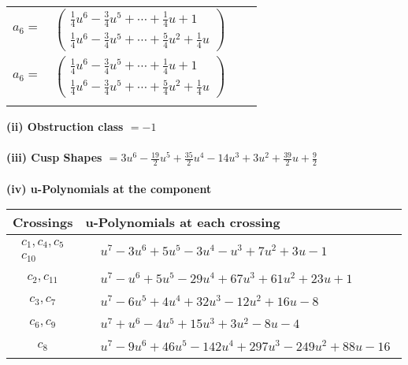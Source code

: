 \documentclass[1p]{elsarticle_modified}
\theoremstyle{definition}
\begin{document}
\begin{tabular}{m{7pt} m{180pt} m{7pt} m{180pt} }
\flushright $a_{6}=$&$\begin{pmatrix}\frac{1}{4} u^6-\frac{3}{4} u^5+\cdots+\frac{1}{4} u+1\\\frac{1}{4} u^6-\frac{3}{4} u^5+\cdots+\frac{5}{4} u^2+\frac{1}{4} u\end{pmatrix}$\\ \flushright $a_{6}=$&$\begin{pmatrix}\frac{1}{4} u^6-\frac{3}{4} u^5+\cdots+\frac{1}{4} u+1\\\frac{1}{4} u^6-\frac{3}{4} u^5+\cdots+\frac{5}{4} u^2+\frac{1}{4} u\end{pmatrix}$\\&\end{tabular}
\flushleft \textbf{(ii) Obstruction class $= -1$}\\~\\
\flushleft \textbf{(iii) Cusp Shapes $= 3 u^6-\frac{19}{2} u^5+\frac{35}{2} u^4-14 u^3+3 u^2+\frac{39}{2} u+\frac{9}{2}$}\\~\\
\newpage\renewcommand{\arraystretch}{1}
\flushleft \textbf{(iv) u-Polynomials at the component}\newline \\
\begin{tabular}{m{50pt}|m{274pt}}
Crossings & \hspace{64pt}u-Polynomials at each crossing \\
\hline $$\begin{aligned}c_{1},c_{4},c_{5}\\c_{10}\end{aligned}$$&$\begin{aligned}
&u^7-3 u^6+5 u^5-3 u^4- u^3+7 u^2+3 u-1
\end{aligned}$\\
\hline $$\begin{aligned}c_{2},c_{11}\end{aligned}$$&$\begin{aligned}
&u^7- u^6+5 u^5-29 u^4+67 u^3+61 u^2+23 u+1
\end{aligned}$\\
\hline $$\begin{aligned}c_{3},c_{7}\end{aligned}$$&$\begin{aligned}
&u^7-6 u^5+4 u^4+32 u^3-12 u^2+16 u-8
\end{aligned}$\\
\hline $$\begin{aligned}c_{6},c_{9}\end{aligned}$$&$\begin{aligned}
&u^7+u^6-4 u^5+15 u^3+3 u^2-8 u-4
\end{aligned}$\\
\hline $$\begin{aligned}c_{8}\end{aligned}$$&$\begin{aligned}
&u^7-9 u^6+46 u^5-142 u^4+297 u^3-249 u^2+88 u-16
\end{aligned}$\\
\hline
\end{tabular}\\~\\
\end{document}
